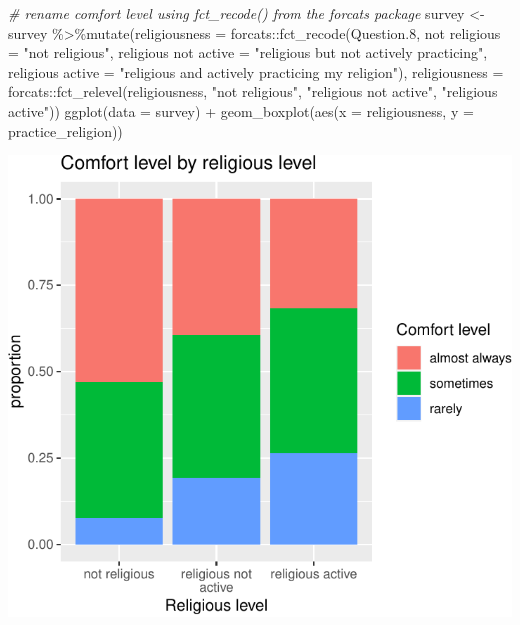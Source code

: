 \documentclass[
]{book}
\newenvironment{Shaded}{\begin{snugshade}}{\end{snugshade}}
\newcommand{\AttributeTok}[1]{\textcolor[rgb]{0.77,0.63,0.00}{#1}}
\newcommand{\CommentTok}[1]{\textcolor[rgb]{0.56,0.35,0.01}{\textit{#1}}}
\newcommand{\FloatTok}[1]{\textcolor[rgb]{0.00,0.00,0.81}{#1}}
\newcommand{\FunctionTok}[1]{\textcolor[rgb]{0.00,0.00,0.00}{#1}}
\newcommand{\NormalTok}[1]{#1}
\newcommand{\OtherTok}[1]{\textcolor[rgb]{0.56,0.35,0.01}{#1}}
\newcommand{\SpecialCharTok}[1]{\textcolor[rgb]{0.00,0.00,0.00}{#1}}
\newcommand{\StringTok}[1]{\textcolor[rgb]{0.31,0.60,0.02}{#1}}
\begin{document}
\begin{Shaded}
\begin{Highlighting}[]
\CommentTok{\# rename comfort level using fct\_recode() from the forcats package}
\NormalTok{survey }\OtherTok{\textless{}{-}}\NormalTok{ survey }\SpecialCharTok{\%\textgreater{}\%}\FunctionTok{mutate}\NormalTok{(}\AttributeTok{religiousness =}\NormalTok{ forcats}\SpecialCharTok{::}\FunctionTok{fct\_recode}\NormalTok{(Question}\FloatTok{.8}\NormalTok{, }
                          \StringTok{\textasciigrave{}}\AttributeTok{not religious}\StringTok{\textasciigrave{}} \OtherTok{=} \StringTok{"not religious"}\NormalTok{,}
                          \StringTok{\textasciigrave{}}\AttributeTok{religious not active}\StringTok{\textasciigrave{}} \OtherTok{=} \StringTok{"religious but not actively practicing"}\NormalTok{,}
                          \StringTok{\textasciigrave{}}\AttributeTok{religious active}\StringTok{\textasciigrave{}} \OtherTok{=} \StringTok{"religious and actively practicing my religion"}\NormalTok{),}
                          \AttributeTok{religiousness =}\NormalTok{ forcats}\SpecialCharTok{::}\FunctionTok{fct\_relevel}\NormalTok{(religiousness,}
                                                               \StringTok{"not religious"}\NormalTok{,}
                                                               \StringTok{"religious not active"}\NormalTok{,}
                                                               \StringTok{"religious active"}\NormalTok{))}
\FunctionTok{ggplot}\NormalTok{(}\AttributeTok{data =}\NormalTok{ survey) }\SpecialCharTok{+}
    \FunctionTok{geom\_boxplot}\NormalTok{(}\FunctionTok{aes}\NormalTok{(}\AttributeTok{x =}\NormalTok{ religiousness, }\AttributeTok{y =}\NormalTok{ practice\_religion))}
\end{Highlighting}
\end{Shaded}

\includegraphics[width=1\linewidth]{Class_Activity_22_files/figure-latex/unnamed-chunk-4-1}
\end{document}

